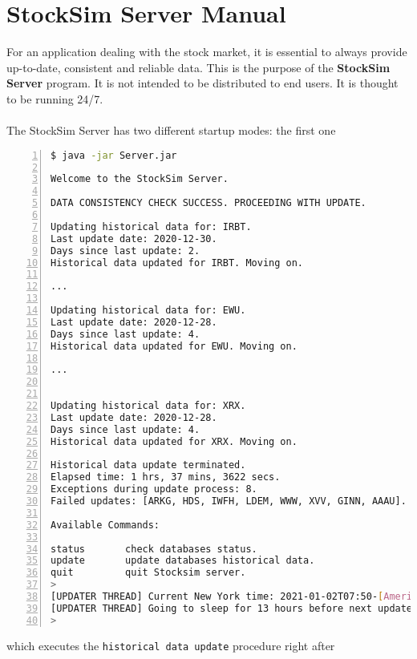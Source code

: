 \chapter{StockSim Server Manual}
For an application dealing with the stock market, it is essential to 
always provide up-to-date, consistent and reliable data. This is the purpose of 
the \textbf{StockSim Server} program. It is not intended to be distributed to 
end users. It is thought to be running 24/7.\\
\\
The StockSim Server has two different startup modes: the first one
\begin{lstlisting}[basicstyle=\footnotesize,language=bash,numbers=left,
numberstyle=\footnotesize,numbersep=8pt,frame=single]
$ java -jar Server.jar

Welcome to the StockSim Server.

DATA CONSISTENCY CHECK SUCCESS. PROCEEDING WITH UPDATE.

Updating historical data for: IRBT.
Last update date: 2020-12-30.
Days since last update: 2.
Historical data updated for IRBT. Moving on.

...

Updating historical data for: EWU.
Last update date: 2020-12-28.
Days since last update: 4.
Historical data updated for EWU. Moving on.

...


Updating historical data for: XRX.
Last update date: 2020-12-28.
Days since last update: 4.
Historical data updated for XRX. Moving on.

Historical data update terminated.
Elapsed time: 1 hrs, 37 mins, 3622 secs.
Exceptions during update process: 8.
Failed updates: [ARKG, HDS, IWFH, LDEM, WWW, XVV, GINN, AAAU].

Available Commands:

status       check databases status.
update       update databases historical data.
quit         quit Stocksim server.
> 
[UPDATER THREAD] Current New York time: 2021-01-02T07:50-[America/New_York]
[UPDATER THREAD] Going to sleep for 13 hours before next update.
> 
\end{lstlisting}
which executes the \texttt{historical data update} procedure right after

